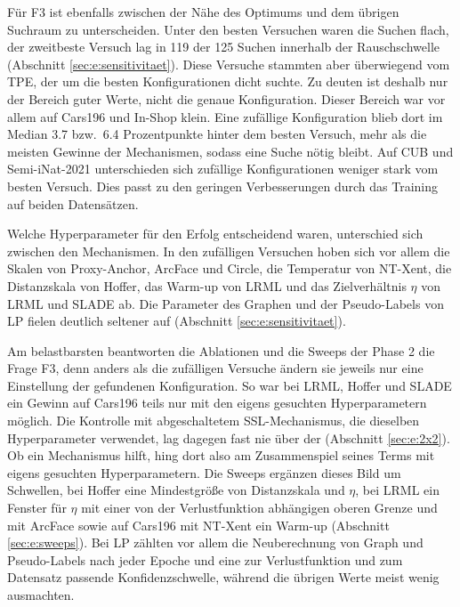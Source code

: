 Für F3 ist ebenfalls zwischen der Nähe des Optimums und dem übrigen Suchraum zu unterscheiden. Unter den besten Versuchen waren die Suchen flach, der zweitbeste Versuch lag in 119 der 125 Suchen innerhalb der Rauschschwelle (Abschnitt \ref{sec:e:sensitivitaet}). Diese Versuche stammten aber überwiegend vom \ac{TPE}, der um die besten Konfigurationen dicht suchte. Zu deuten ist deshalb nur der Bereich guter Werte, nicht die genaue Konfiguration. Dieser Bereich war vor allem auf Cars196 und In-Shop klein. Eine zufällige Konfiguration blieb dort im Median \num{3.7} bzw.\ \num{6.4} Prozentpunkte hinter dem besten Versuch, mehr als die meisten Gewinne der Mechanismen, sodass eine Suche nötig bleibt. Auf \ac{CUB} und Semi-iNat-2021 unterschieden sich zufällige Konfigurationen weniger stark vom besten Versuch. Dies passt zu den geringen Verbesserungen durch das Training auf beiden Datensätzen.

Welche Hyperparameter für den Erfolg entscheidend waren, unterschied sich zwischen den Mechanismen. In den zufälligen Versuchen hoben sich vor allem die Skalen von Proxy-Anchor, ArcFace und Circle, die Temperatur von \ac{NT-Xent}, die Distanzskala von Hoffer, das Warm-up von \ac{LRML} und das Zielverhältnis $\eta$ von \ac{LRML} und \ac{SLADE} ab. Die Parameter des Graphen und der Pseudo-Labels von \ac{LP} fielen deutlich seltener auf (Abschnitt \ref{sec:e:sensitivitaet}). 

Am belastbarsten beantworten die Ablationen und die Sweeps der Phase 2 die Frage F3, denn anders als die zufälligen Versuche ändern sie jeweils nur eine Einstellung der gefundenen Konfiguration. So war bei \ac{LRML}, Hoffer und \ac{SLADE} ein Gewinn auf Cars196 teils nur mit den eigens gesuchten Hyperparametern möglich. Die Kontrolle mit abgeschaltetem \ac{SSL}-Mechanismus, die dieselben Hyperparameter verwendet, lag dagegen fast nie über der \UEBL (Abschnitt \ref{sec:e:2x2}). Ob ein Mechanismus hilft, hing dort also am Zusammenspiel seines Terms mit eigens gesuchten Hyperparametern. Die Sweeps ergänzen dieses Bild um Schwellen, bei Hoffer eine Mindestgröße von Distanzskala und $\eta$, bei \ac{LRML} ein Fenster für $\eta$ mit einer von der Verlustfunktion abhängigen oberen Grenze und mit ArcFace sowie auf Cars196 mit \ac{NT-Xent} ein Warm-up (Abschnitt \ref{sec:e:sweeps}). Bei \ac{LP} zählten vor allem die Neuberechnung von Graph und Pseudo-Labels nach jeder Epoche und eine zur Verlustfunktion und zum Datensatz passende Konfidenzschwelle, während die übrigen Werte meist wenig ausmachten. 

